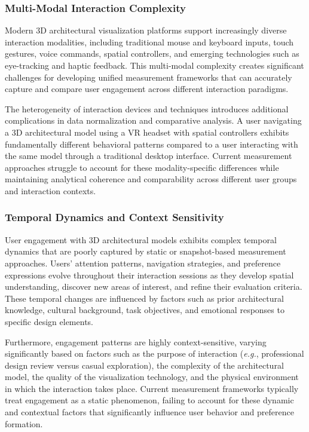 \documentclass[12pt,a4paper]{book}
\begin{document}
\subsubsection{Multi-Modal Interaction Complexity}
\label{subsubsec:multimodal_complexity}

Modern 3D architectural visualization platforms support increasingly diverse interaction modalities, including traditional mouse and keyboard inputs, touch gestures, voice commands, spatial controllers, and emerging technologies such as eye-tracking and haptic feedback. This multi-modal complexity creates significant challenges for developing unified measurement frameworks that can accurately capture and compare user engagement across different interaction paradigms.

The heterogeneity of interaction devices and techniques introduces additional complications in data normalization and comparative analysis. A user navigating a 3D architectural model using a VR headset with spatial controllers exhibits fundamentally different behavioral patterns compared to a user interacting with the same model through a traditional desktop interface. Current measurement approaches struggle to account for these modality-specific differences while maintaining analytical coherence and comparability across different user groups and interaction contexts.

\subsubsection{Temporal Dynamics and Context Sensitivity}
\label{subsubsec:temporal_dynamics}

User engagement with 3D architectural models exhibits complex temporal dynamics that are poorly captured by static or snapshot-based measurement approaches. Users' attention patterns, navigation strategies, and preference expressions evolve throughout their interaction sessions as they develop spatial understanding, discover new areas of interest, and refine their evaluation criteria. These temporal changes are influenced by factors such as prior architectural knowledge, cultural background, task objectives, and emotional responses to specific design elements.

Furthermore, engagement patterns are highly context-sensitive, varying significantly based on factors such as the purpose of interaction (\textit{e.g.}, professional design review versus casual exploration), the complexity of the architectural model, the quality of the visualization technology, and the physical environment in which the interaction takes place. Current measurement frameworks typically treat engagement as a static phenomenon, failing to account for these dynamic and contextual factors that significantly influence user behavior and preference formation.
\end{document}
